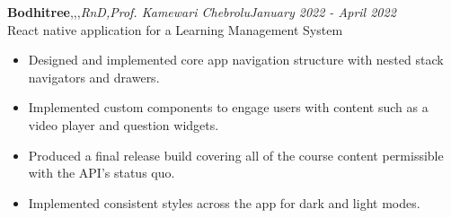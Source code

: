 \textbf{Bodhitree}\sep\react\sep\js\sep{\it RnD\sep Prof. Kamewari Chebrolu}\hfill{\sl \small January 2022 - April 2022}\\
\vspace{-8pt}
\emerrow React native application for a Learning Management System 
\begin{itemize}[itemsep = -1.7 mm, leftmargin=*]
\item Designed and implemented core app navigation structure with nested stack navigators and drawers.
\item Implemented custom components to engage users with content such as a video player and question widgets.
\item Produced a final release build covering all of the course content permissible with the API's status quo.
\item Implemented consistent styles across the app for dark and light modes.
\end{itemize}
